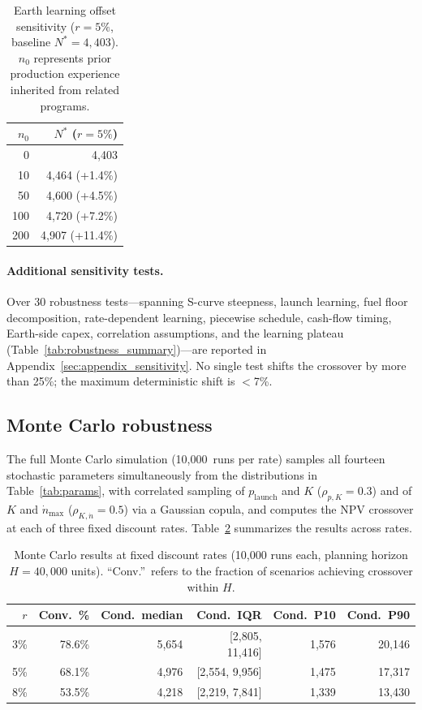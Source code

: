 \documentclass[preprint,12pt]{elsarticle}
\begin{document}
\begin{table}[htbp]
\centering
\caption{Earth learning offset sensitivity ($r = 5\%$, baseline $N^* = 4{,}403$). $n_0$ represents prior production experience inherited from related programs.}
\label{tab:earth_n0}
\small
\begin{tabular}{@{}rr@{}}
\toprule
$n_0$ & $N^*$ ($r = 5\%$) \\
\midrule
0   & 4{,}403 \\
10  & 4{,}464 (+1.4\%) \\
50  & 4{,}600 (+4.5\%) \\
100 & 4{,}720 (+7.2\%) \\
200 & 4{,}907 (+11.4\%) \\
\bottomrule
\end{tabular}
\end{table}

\paragraph{Additional sensitivity tests.} Over 30 robustness tests---spanning S-curve steepness, launch learning, fuel floor decomposition, rate-dependent learning, piecewise schedule, cash-flow timing, Earth-side capex, correlation assumptions, and the learning plateau (Table~\ref{tab:robustness_summary})---are reported in Appendix~\ref{sec:appendix_sensitivity}. No single test shifts the crossover by more than 25\%; the maximum deterministic shift is $<$7\%.

\subsection{Monte Carlo robustness}
\label{sec:mc_robustness}

The full Monte Carlo simulation (10{,}000~runs per rate) samples all fourteen stochastic parameters simultaneously from the distributions in Table~\ref{tab:params}, with correlated sampling of $p_{\mathrm{launch}}$ and $K$ ($\rho_{p,K} = 0.3$) and of $K$ and $\dot{n}_{\max}$ ($\rho_{K,\dot{n}} = 0.5$) via a Gaussian copula, and computes the NPV crossover at each of three fixed discount rates. Table~\ref{tab:mc_summary} summarizes the results across rates.

\begin{table}[htbp]
\centering
\caption{Monte Carlo results at fixed discount rates (10{,}000 runs each, planning horizon $H = 40{,}000$ units). ``Conv.''\ refers to the fraction of scenarios achieving crossover within $H$.}
\label{tab:mc_summary}
\small
\begin{tabular}{@{}rrrrrr@{}}
\toprule
$r$ & Conv.\ \% & Cond.\ median & Cond.\ IQR & Cond.\ P10 & Cond.\ P90 \\
\midrule
3\%  & 78.6\% & 5{,}654 & [2{,}805, 11{,}416] & 1{,}576 & 20{,}146 \\
5\%  & 68.1\% & 4{,}976 & [2{,}554, 9{,}956]  & 1{,}475 & 17{,}317 \\
8\%  & 53.5\% & 4{,}218 & [2{,}219, 7{,}841]  & 1{,}339 & 13{,}430 \\
\bottomrule
\end{tabular}
\end{table}
\end{document}
